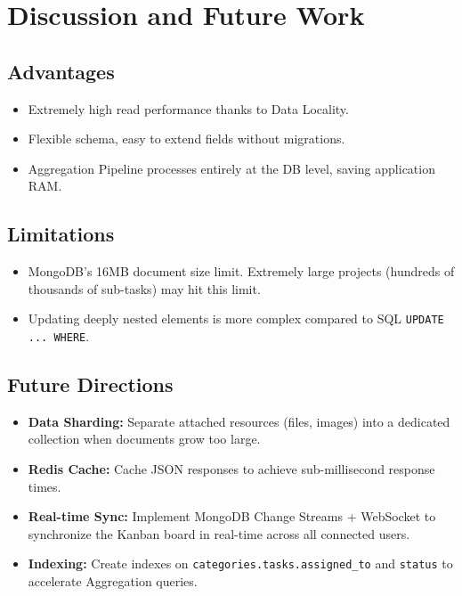 \documentclass[a4paper,12pt]{article}
\begin{document}
\section{Discussion and Future Work}
\subsection{Advantages}
\begin{itemize}
    \item Extremely high read performance thanks to Data Locality.
    \item Flexible schema, easy to extend fields without migrations.
    \item Aggregation Pipeline processes entirely at the DB level, saving application RAM.
\end{itemize}

\subsection{Limitations}
\begin{itemize}
    \item MongoDB's 16MB document size limit. Extremely large projects (hundreds of thousands of sub-tasks) may hit this limit.
    \item Updating deeply nested elements is more complex compared to SQL \texttt{UPDATE ... WHERE}.
\end{itemize}

\subsection{Future Directions}
\begin{itemize}
    \item \textbf{Data Sharding:} Separate attached resources (files, images) into a dedicated collection when documents grow too large.
    \item \textbf{Redis Cache:} Cache JSON responses to achieve sub-millisecond response times.
    \item \textbf{Real-time Sync:} Implement MongoDB Change Streams + WebSocket to synchronize the Kanban board in real-time across all connected users.
    \item \textbf{Indexing:} Create indexes on \texttt{categories.tasks.assigned\_to} and \texttt{status} to accelerate Aggregation queries.
\end{itemize}
\end{document}
